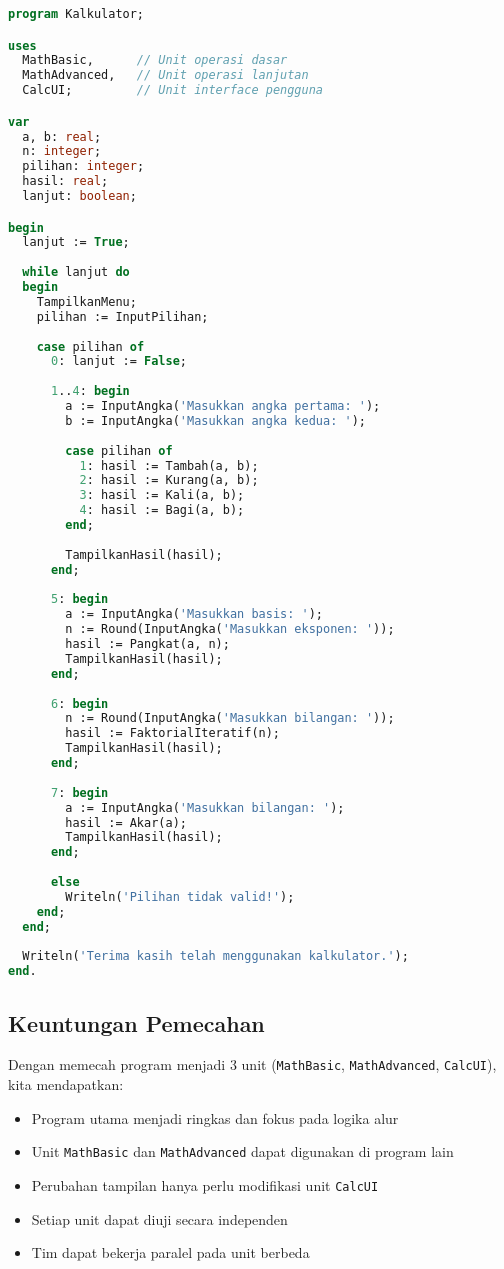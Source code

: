 \documentclass[../main.tex]{subfiles}
\begin{document}
\begin{lstlisting}[language=Pascal, caption={kalkulator.pas - program utama modular}]
program Kalkulator;

uses
  MathBasic,      // Unit operasi dasar
  MathAdvanced,   // Unit operasi lanjutan
  CalcUI;         // Unit interface pengguna

var
  a, b: real;
  n: integer;
  pilihan: integer;
  hasil: real;
  lanjut: boolean;

begin
  lanjut := True;
  
  while lanjut do
  begin
    TampilkanMenu;
    pilihan := InputPilihan;
    
    case pilihan of
      0: lanjut := False;
      
      1..4: begin
        a := InputAngka('Masukkan angka pertama: ');
        b := InputAngka('Masukkan angka kedua: ');
        
        case pilihan of
          1: hasil := Tambah(a, b);
          2: hasil := Kurang(a, b);
          3: hasil := Kali(a, b);
          4: hasil := Bagi(a, b);
        end;
        
        TampilkanHasil(hasil);
      end;
      
      5: begin
        a := InputAngka('Masukkan basis: ');
        n := Round(InputAngka('Masukkan eksponen: '));
        hasil := Pangkat(a, n);
        TampilkanHasil(hasil);
      end;
      
      6: begin
        n := Round(InputAngka('Masukkan bilangan: '));
        hasil := FaktorialIteratif(n);
        TampilkanHasil(hasil);
      end;
      
      7: begin
        a := InputAngka('Masukkan bilangan: ');
        hasil := Akar(a);
        TampilkanHasil(hasil);
      end;
      
      else
        Writeln('Pilihan tidak valid!');
    end;
  end;
  
  Writeln('Terima kasih telah menggunakan kalkulator.');
end.
\end{lstlisting}

\subsection{Keuntungan Pemecahan}
Dengan memecah program menjadi 3 unit (\texttt{MathBasic}, \texttt{MathAdvanced}, \texttt{CalcUI}), kita mendapatkan:
\begin{itemize}
  \item Program utama menjadi ringkas dan fokus pada logika alur
  \item Unit \texttt{MathBasic} dan \texttt{MathAdvanced} dapat digunakan di program lain
  \item Perubahan tampilan hanya perlu modifikasi unit \texttt{CalcUI}
  \item Setiap unit dapat diuji secara independen
  \item Tim dapat bekerja paralel pada unit berbeda
\end{itemize}
\end{document}
